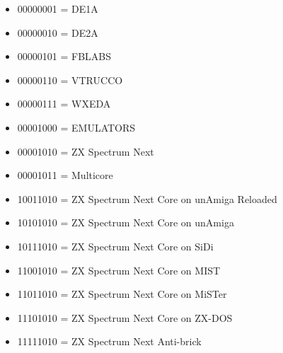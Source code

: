 \begin{itemize}
\item 00000001 = DE1A
\item 00000010 = DE2A
\item 00000101 = FBLABS
\item 00000110 = VTRUCCO
\item 00000111 = WXEDA
\item 00001000 = EMULATORS
\item 00001010 = ZX Spectrum Next
\item 00001011 = Multicore
\item 10011010 = ZX Spectrum Next Core on unAmiga Reloaded
\item 10101010 = ZX Spectrum Next Core on unAmiga
\item 10111010 = ZX Spectrum Next Core on SiDi
\item 11001010 = ZX Spectrum Next Core on MIST
\item 11011010 = ZX Spectrum Next Core on MiSTer
\item 11101010 = ZX Spectrum Next Core on ZX-DOS
\item 11111010 = ZX Spectrum Next Anti-brick
\end{itemize}

